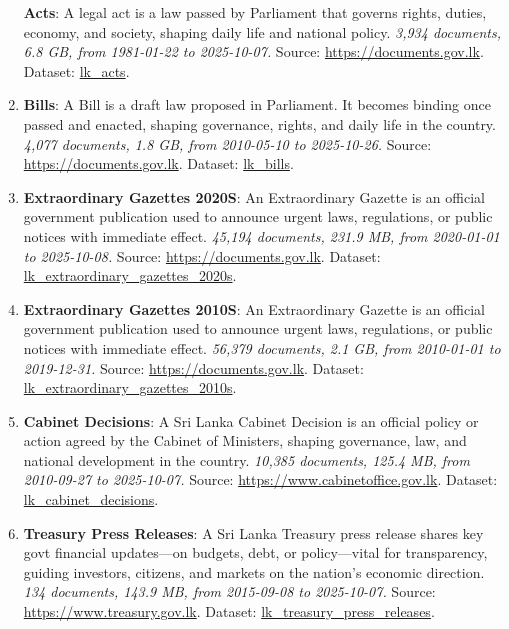 \documentclass[10pt,a4paper]{article}%
\begin{document}
\begin{enumerate}
\textbf{Acts}: A legal act is a law passed by Parliament that governs rights, duties, economy, and society, shaping daily life and national policy.\textit{ 3,934 documents, 6.8 GB, from 1981{-}01{-}22 to 2025{-}10{-}07.} Source: \href{https://documents.gov.lk}{https://documents.gov.lk}. Dataset: \href{https://github.com/nuuuwan/lk\_legal\_docs/tree/data\_lk\_acts/data/lk\_acts}{lk\_acts}.%
\item%
\textbf{Bills}: A Bill is a draft law proposed in Parliament. It becomes binding once passed and enacted, shaping governance, rights, and daily life in the country.\textit{ 4,077 documents, 1.8 GB, from 2010{-}05{-}10 to 2025{-}10{-}26.} Source: \href{https://documents.gov.lk}{https://documents.gov.lk}. Dataset: \href{https://github.com/nuuuwan/lk\_legal\_docs/tree/data\_lk\_bills/data/lk\_bills}{lk\_bills}.%
\item%
\textbf{Extraordinary Gazettes 2020S}: An Extraordinary Gazette is an official government publication used to announce urgent laws, regulations, or public notices with immediate effect.\textit{ 45,194 documents, 231.9 MB, from 2020{-}01{-}01 to 2025{-}10{-}08.} Source: \href{https://documents.gov.lk}{https://documents.gov.lk}. Dataset: \href{https://github.com/nuuuwan/lk\_legal\_docs/tree/data\_lk\_extraordinary\_gazettes\_2020s/data/lk\_extraordinary\_gazettes\_2020s}{lk\_extraordinary\_gazettes\_2020s}.%
\item%
\textbf{Extraordinary Gazettes 2010S}: An Extraordinary Gazette is an official government publication used to announce urgent laws, regulations, or public notices with immediate effect.\textit{ 56,379 documents, 2.1 GB, from 2010{-}01{-}01 to 2019{-}12{-}31.} Source: \href{https://documents.gov.lk}{https://documents.gov.lk}. Dataset: \href{https://github.com/nuuuwan/lk\_legal\_docs/tree/data\_lk\_extraordinary\_gazettes\_2010s/data/lk\_extraordinary\_gazettes\_2010s}{lk\_extraordinary\_gazettes\_2010s}.%
\item%
\textbf{Cabinet Decisions}: A Sri Lanka Cabinet Decision is an official policy or action agreed by the Cabinet of Ministers, shaping governance, law, and national development in the country.\textit{ 10,385 documents, 125.4 MB, from 2010{-}09{-}27 to 2025{-}10{-}07.} Source: \href{https://www.cabinetoffice.gov.lk}{https://www.cabinetoffice.gov.lk}. Dataset: \href{https://github.com/nuuuwan/lk\_cabinet\_decisions/tree/data/data/lk\_cabinet\_decisions}{lk\_cabinet\_decisions}.%
\item%
\textbf{Treasury Press Releases}: A Sri Lanka Treasury press release shares key govt financial updates—on budgets, debt, or policy—vital for transparency, guiding investors, citizens, and markets on the nation’s economic direction.\textit{ 134 documents, 143.9 MB, from 2015{-}09{-}08 to 2025{-}10{-}07.} Source: \href{https://www.treasury.gov.lk}{https://www.treasury.gov.lk}. Dataset: \href{https://github.com/nuuuwan/lk\_treasury/tree/data\_lk\_treasury\_press\_releases/data/lk\_treasury\_press\_releases}{lk\_treasury\_press\_releases}.%

\end{enumerate}
\end{document}
